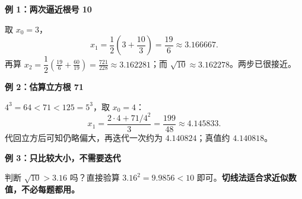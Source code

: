 \clearpage
\begin{examplebox}
\textbf{\textcolor{CExample}{例 1：两次逼近根号 10}}
\par\medskip
\begin{center}

\end{center}
\medskip
取 $x_0=3$，\[x_1=\frac12\left(3+\frac{10}{3}\right)=\frac{19}{6}\approx3.166667.\]再算 $x_2=\dfrac12\left(\frac{19}{6}+\frac{60}{19}\right)=\frac{721}{228}\approx3.162281$；而 $\sqrt{10}\approx3.162278$。两步已很接近。
\end{examplebox}
\clearpage
\begin{examplebox}
\textbf{\textcolor{CExample}{例 2：估算立方根 71}}
\par\medskip
\begin{center}

\end{center}
\medskip
$4^3=64<71<125=5^3$，取 $x_0=4$：\[x_1=\frac{2\cdot4+71/4^2}{3}=\frac{199}{48}\approx4.145833.\]代回立方后可知仍略偏大，再迭代一次约为 $4.140824$；真值约 $4.140818$。
\end{examplebox}
\clearpage
\begin{examplebox}
\textbf{\textcolor{CExample}{例 3：只比较大小，不需要迭代}}
\par\medskip
\begin{center}

\end{center}
\medskip
判断 $\sqrt{10}>3.16$ 吗？直接验算 $3.16^2=9.9856<10$ 即可。\textbf{切线法适合求近似数值，不必每题都用。}
\end{examplebox}
